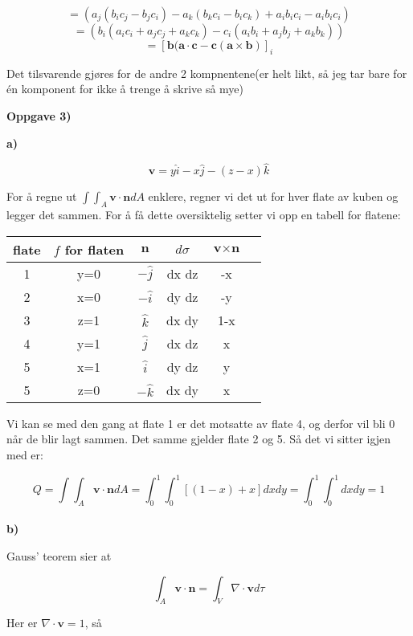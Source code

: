 \documentclass[a4paper,norsk,11pt,twoside]{article}
\begin{document}
$$
= (a_j(b_i c_j - b_j c_i) - a_k(b_k c_i - b_i c_k) + a_ib_ic_i - a_ib_ic_i)
$$
$$
= (b_i(a_ic_i +a_jc_j + a_kc_k) - c_i(a_ib_i + a_jb_j + a_kb_k))
$$
$$
= [\textbf{b}(\textbf{a} \cdot \textbf{c} - \textbf{c}(\textbf{a} \times \textbf{b})]_i
$$

Det tilsvarende gjøres for de andre 2 kompnentene(er helt likt, så jeg tar bare for én komponent for ikke å trenge å skrive så mye)

\textbf{Oppgave 3)}

\textbf{a)}

$$
\textbf{v} = y\hat{i} - x\hat{j} - (z-x)\hat{k}
$$

For å regne ut $\int \int_A \textbf{v} \cdot \textbf{n} dA$ enklere, regner vi det ut for hver flate av kuben og legger det sammen. For å få dette oversiktelig setter vi opp en tabell for flatene:

\begin{table}[h!]
  \centering

  \label{tab:table1}
  \begin{tabular}{c|c|c|c|c|c}
    flate & $f$ for flaten & $ \textbf{n} $ & $d\sigma$ & $\textbf{v} \times \textbf{n}$\\
    \hline
    1 & y=0 & $ -\hat j $ & dx dz & -x \\
    \hline
    2 & x=0 & $ -\hat i $ & dy dz & -y \\
    \hline
    3 & z=1 & $ \hat k $ & dx dy & 1-x \\
    \hline
    4 & y=1 & $ \hat j $ & dx dz & x \\
    \hline
    5 & x=1 & $ \hat i $ & dy dz & y \\
    \hline
    5 & z=0 & $ -\hat k $ & dx dy & x 
  \end{tabular}
\end{table}


Vi kan se med den gang at flate 1 er det motsatte av flate 4, og derfor vil bli 0 når de blir lagt sammen. Det samme gjelder flate 2 og 5. Så det vi sitter igjen med er:

$$
Q = \int \int_A \textbf{v} \cdot \textbf{n} dA =\int_0 ^{1} \int_0 ^{1}[(1-x) + x]dxdy = \int_0 ^{1} \int_0 ^{1} dxdy = 1
$$\\

\textbf{b)}

Gauss' teorem sier at 

$$
\int_A \textbf{v} \cdot \textbf{n} = \int_V \nabla \cdot \textbf{v} d\tau
$$

Her er $\nabla \cdot \textbf{v} = 1$, så
\end{document}
